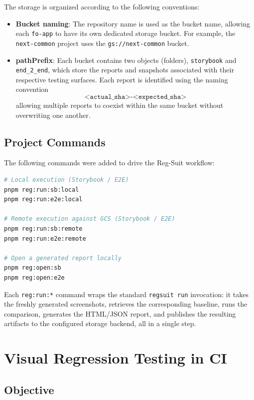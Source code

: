 The storage is organized according to the following conventions:

\begin{itemize}
    \item \textbf{Bucket naming}: The repository name is used as the bucket name, allowing each \texttt{fo-app} to have its own dedicated storage bucket. For example, the \texttt{next-common} project uses the \texttt{gs://next-common} bucket.

    \item \textbf{pathPrefix}: Each bucket contains two objects (folders), \texttt{storybook} and \texttt{end\_2\_end}, which store the reports and snapshots associated with their respective testing surfaces. Each report is identified using the naming convention
    \[
        \texttt{<actual\_sha>-<expected\_sha>}
    \]
    allowing multiple reports to coexist within the same bucket without overwriting one another.
\end{itemize}

\subsection{Project Commands}

The following commands were added to drive the Reg-Suit workflow:

\begin{lstlisting}[language=bash]
# Local execution (Storybook / E2E)
pnpm reg:run:sb:local
pnpm reg:run:e2e:local

# Remote execution against GCS (Storybook / E2E)
pnpm reg:run:sb:remote
pnpm reg:run:e2e:remote

# Open a generated report locally
pnpm reg:open:sb
pnpm reg:open:e2e
\end{lstlisting}

Each \texttt{reg:run:*} command wraps the standard \texttt{regsuit run} invocation: it takes the freshly generated screenshots, retrieves the corresponding baseline, runs the comparison, generates the HTML/JSON report, and publishes the resulting artifacts to the configured storage backend, all in a single step.

\section{Visual Regression Testing in CI}

\subsection{Objective}

